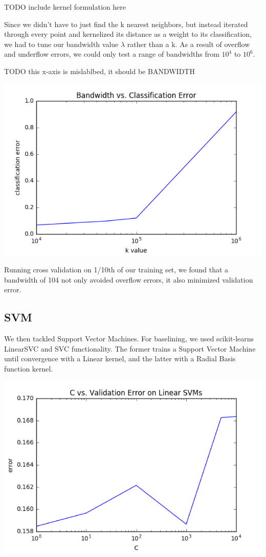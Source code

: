 \documentclass{article} %
\begin{document}
TODO include kernel formulation here

Since we didn’t have to just find the k nearest neighbors, but instead
iterated through every point and kernelized its distance as a weight to
its classification, we had to tune our bandwidth value $\lambda$ rather than a k.
As a result of overflow and underflow errors, we could only test a range
of bandwidths from $10^4$ to $10^6$. 

TODO this x-axis is mislablbed, it should be BANDWIDTH

\includegraphics[width=\textwidth]{knn-kernel-bandwidth-cv.png}

Running cross validation on 1/10th of our training set, we found that a
bandwidth of 104 not only avoided overflow errors, it also minimized validation error.

\subsection{SVM}
We then tackled Support Vector Machines. For baselining,
we used scikit-learns LinearSVC and SVC functionality. The
former trains a Support Vector Machine until convergence with
a Linear kernel, and the latter with a Radial Basis function kernel. 

\includegraphics[width=\textwidth]{sklearn-svm-c-cv.png}
\end{document}
